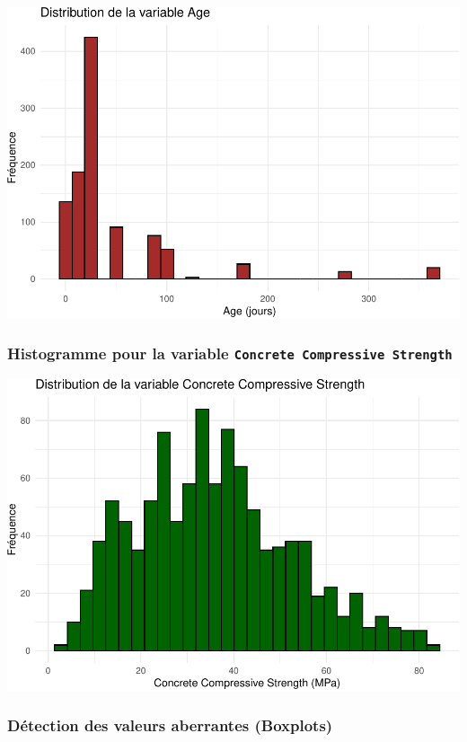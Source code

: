 \documentclass[
  12pt,
]{article}
\begin{document}
\includegraphics{rmd_final_files/figure-latex/unnamed-chunk-47-1.pdf}

\subsubsection{\texorpdfstring{Histogramme pour la variable
\texttt{Concrete\ Compressive\ Strength}}{Histogramme pour la variable Concrete Compressive Strength}}\label{histogramme-pour-la-variable-concrete-compressive-strength}

\includegraphics{rmd_final_files/figure-latex/unnamed-chunk-48-1.pdf}

\subsubsection{Détection des valeurs aberrantes
(Boxplots)}\label{duxe9tection-des-valeurs-aberrantes-boxplots}
\end{document}
